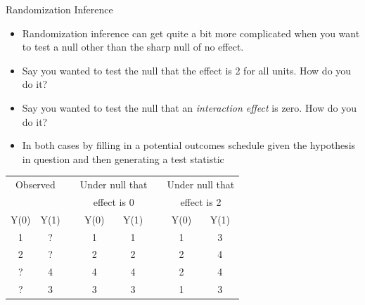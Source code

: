 \documentclass[
  11pt,
  ignorenonframetext,
]{beamer}
\providecommand{\tightlist}{%
  \setlength{\itemsep}{0pt}\setlength{\parskip}{0pt}}\usepackage{longtable,booktabs,array}
\begin{document}
\begin{frame}{Randomization Inference}
\protect\hypertarget{randomization-inference-7}{}
\begin{itemize}
\tightlist
\item
  Randomization inference can get quite a bit more complicated when you
  want to test a null other than the sharp null of no effect.
\item
  Say you wanted to test the null that the effect is 2 for all units.
  How do you do it?
\item
  Say you wanted to test the null that an \emph{interaction effect} is
  zero. How do you do it?
\item
  In both cases by filling in a potential outcomes schedule given the
  hypothesis in question and then generating a test statistic
\end{itemize}

\begin{table}
\centering
\begin{tabular}{cccccccc}

\multicolumn{ 2}{c}{Observed} &            & \multicolumn{ 2}{c}{Under null that } &            & \multicolumn{ 2}{c}{Under null that } \\

           &            &            & \multicolumn{ 2}{c}{effect is 0} &            & \multicolumn{ 2}{c}{effect is 2} \\  \hline

      Y(0) &       Y(1) &            &       Y(0) &       Y(1) &            &       Y(0) &       Y(1) \\

         1 &          ? &            &          1 &          1 &            &          1 &          3 \\

         2 &          ? &            &          2 &          2 &            &          2 &          4 \\

         ? &          4 &            &          4 &          4 &            &          2 &          4 \\

         ? &          3 &            &          3 &          3 &            &          1 &          3 \\

\end{tabular}  
\end{table}
\end{frame}
\end{document}
